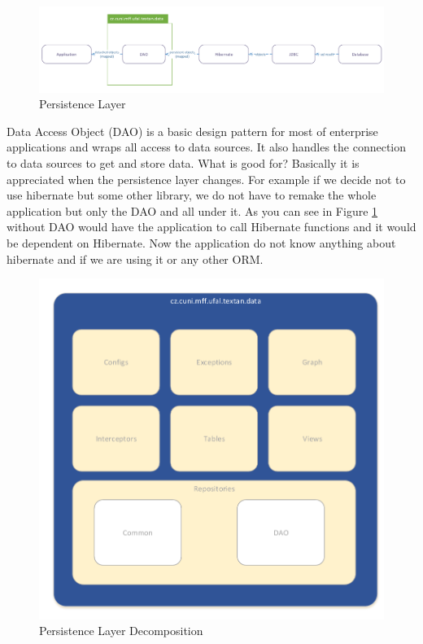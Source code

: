 \begin{figure}[!htb]
        \centering
        \includegraphics[width=\textwidth]{Images/PersistentLayer}
        \caption{Persistence Layer}
        \label{fig:PersistentLayer}
\end{figure}

Data Access Object (DAO) is a basic design pattern for most of enterprise
applications and wraps all access to data sources. It also handles the
connection to data sources to get and store data. What is good for? Basically
it is appreciated when the persistence layer changes. For example if we decide
not to use hibernate but some other library, we do not have to remake the whole
application but only the DAO and all under it. As you can see in Figure
\ref{fig:PersistentLayer} without DAO would have the application
to call Hibernate functions and it would be dependent on Hibernate. Now the
application do not know anything about hibernate and if we are using it or any
other ORM.

\begin{figure}[!htb]
        \centering
        \includegraphics[width=\textwidth]{Images/DataDecomposition}
        \caption{Persistence Layer Decomposition}
        \label{fig:DataDecomposition}
\end{figure}

